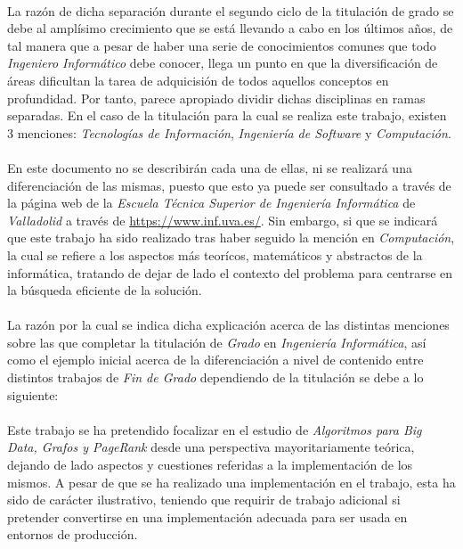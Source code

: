 \documentclass{subfiles}
\begin{document}
      \paragraph{}
      La razón de dicha separación durante el segundo ciclo de la titulación de grado se debe al amplísimo crecimiento que se está llevando a cabo en los últimos años, de tal manera que a pesar de haber una serie de conocimientos comunes que todo \emph{Ingeniero Informático} debe conocer, llega un punto en que la diversificación de áreas dificultan la tarea de adquicisión de todos aquellos conceptos en profundidad. Por tanto, parece apropiado dividir dichas disciplinas en ramas separadas. En el caso de la titulación para la cual se realiza este trabajo, existen 3 menciones: \emph{Tecnologías de Información}, \emph{Ingeniería de Software} y \emph{Computación}.

      \paragraph{}
      En este documento no se describirán cada una de ellas, ni se realizará una diferenciación de las mismas, puesto que esto ya puede ser consultado a través de la página web de la \emph{Escuela Técnica Superior de Ingeniería Informática} de \emph{Valladolid} a través de \url{https://www.inf.uva.es/}. Sin embargo, si que se indicará que este trabajo ha sido realizado tras haber seguido la mención en \emph{Computación}, la cual se refiere a los aspectos más teorícos, matemáticos y abstractos de la informática, tratando de dejar de lado el contexto del problema para centrarse en la búsqueda eficiente de la solución.

      \paragraph{}
      La razón por la cual se indica dicha explicación acerca de las distintas menciones sobre las que completar la titulación de \emph{Grado} en \emph{Ingeniería Informática}, así como el ejemplo inicial acerca de la diferenciación a nivel de contenido entre distintos trabajos de \emph{Fin de Grado} dependiendo de la titulación se debe a lo siguiente:

      \paragraph{}
      Este trabajo se ha pretendido focalizar en el estudio de \emph{Algoritmos para Big Data, Grafos y PageRank} desde una perspectiva mayoritariamente teórica, dejando de lado aspectos y cuestiones referidas a la implementación de los mismos. A pesar de que se ha realizado una implementación en el trabajo, esta ha sido de carácter ilustrativo, teniendo que requirir de trabajo adicional si pretender convertirse en una implementación adecuada para ser usada en entornos de producción.
\end{document}
